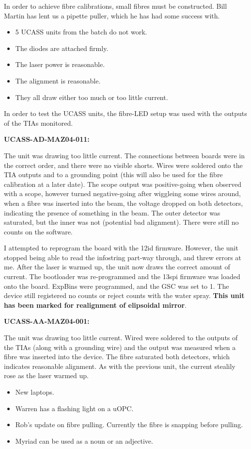 

In order to achieve fibre calibrations, small fibres must be constructed. Bill Martin has lent us a pipette puller, which he has had some success with.


\begin{itemize}
\item 5 UCASS units from the batch do not work.
\item The diodes are attached firmly.
\item The laser power is reasonable.
\item The alignment is reasonable.
\item They all draw either too much or too little current.
\end{itemize}

In order to test the UCASS units, the fibre-LED setup was used with the outputs of the TIAs monitored.

\textbf{UCASS-AD-MAZ04-011:}

The unit was drawing too little current. The connections between boards were in the correct order, and there were no visible shorts. Wires were soldered onto the TIA outputs and to a grounding point (this will also be used for the fibre calibration at a later date). The scope output was positive-going when observed with a scope, however turned negative-going after wiggleing some wires around, when a fibre was inserted into the beam, the voltage dropped on both detectors, indicating the prsence of something in the beam. The outer detector was saturated, but the inner was not (potential bad alignment). There were still no counts on the software.

I attempted to reprogram the board with the 12id firmware. However, the unit stopped being able to read the infostring part-way through, and threw errors at me. After the laser is warmed up, the unit now draws the correct amount of current. The bootloader was re-programmed and the 13spi firmware was loaded onto the board. ExpBins were programmed, and the GSC was set to 1. The device still registered no counts or reject counts with the water spray. \textbf{This unit has been marked for realignment of elipsoidal mirror}.

\textbf{UCASS-AA-MAZ04-001:}

The unit was drawing too little current. Wired were soldered to the outputs of the TIAs (along with a grounding wire) and the output was measured when a fibre was inserted into the device. The fibre saturated both detectors, which indicates reasonable alignment. As with the previous unit, the current stealily rose as the laser warmed up.


\begin{itemize}
\item New laptops.
\item Warren has a flashing light on a uOPC.
\item Rob's update on fibre pulling. Currently the fibre is snapping before pulling.
\item Myriad can be used as a noun or an adjective.
\end{itemize}



